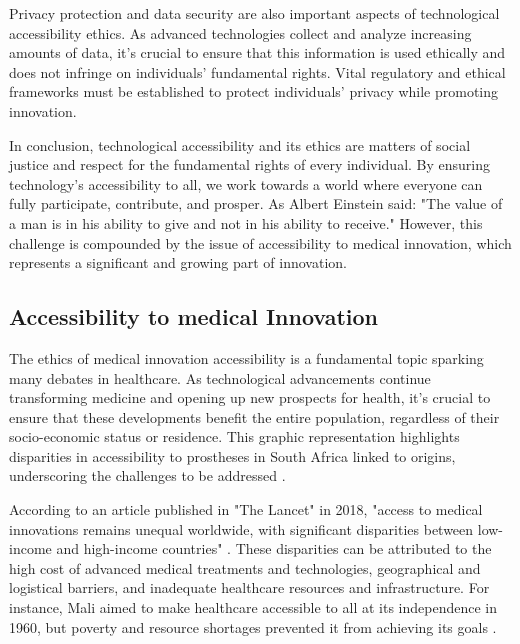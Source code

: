Privacy protection and data security are also important aspects of technological accessibility ethics. As advanced technologies collect and analyze increasing amounts of data, it’s crucial to ensure that this information is used ethically and does not infringe on individuals' fundamental rights. Vital regulatory and ethical frameworks must be established to protect individuals' privacy while promoting innovation.

In conclusion, technological accessibility and its ethics are matters of social justice and respect for the fundamental rights of every individual. By ensuring technology's accessibility to all, we work towards a world where everyone can fully participate, contribute, and prosper. As Albert Einstein said: "The value of a man is in his ability to give and not in his ability to receive."
However, this challenge is compounded by the issue of accessibility to medical innovation, which represents a significant and growing part of innovation.

\subsection{Accessibility to medical Innovation}
The ethics of medical innovation accessibility is a fundamental topic sparking many debates in healthcare. As technological advancements continue transforming medicine and opening up new prospects for health, it’s crucial to ensure that these developments benefit the entire population, regardless of their socio-economic status or residence. This graphic representation highlights disparities in accessibility to prostheses in South Africa linked to origins, underscoring the challenges to be addressed \cite{noauthor_exploring_nodate}.


According to an article published in "The Lancet" in 2018, "access to medical innovations remains unequal worldwide, with significant disparities between low-income and high-income countries" \cite{hanson_lancet_2022}. These disparities can be attributed to the high cost of advanced medical treatments and technologies, geographical and logistical barriers, and inadequate healthcare resources and infrastructure. For instance, Mali aimed to make healthcare accessible to all at its independence in 1960, but poverty and resource shortages prevented it from achieving its goals \cite{noauthor_fragility_nodate}.

